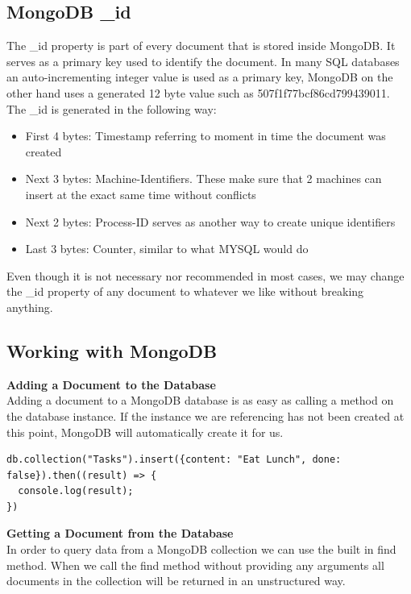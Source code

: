 \documentclass[11pt]{article}
\begin{document}
\subsection{MongoDB \_id}
The \_id property is part of every document that is stored inside MongoDB. It serves as a primary key used to identify the document. In many SQL databases an auto-incrementing integer value is used as a primary key, MongoDB on the other hand uses a generated 12 byte value such as 507f1f77bcf86cd799439011. The \_id is generated in the following way: 

\begin{itemize}
	\item First 4 bytes: Timestamp referring to moment in time the document was created
	\item Next 3 bytes: Machine-Identifiers. These make sure that 2 machines can insert at the exact same time without conflicts
	\item Next 2 bytes: Process-ID serves as another way to create unique identifiers
	\item Last 3 bytes: Counter, similar to what MYSQL would do
\end{itemize} 

Even though it is not necessary nor recommended in most cases, we may change the \_id property of any document to whatever we like without breaking anything. 






\subsection{Working with MongoDB}

\noindent
\textbf{Adding a  Document to the Database} \\  
Adding a document to a MongoDB database is as easy as calling a method on the database instance. If the instance we are referencing has not been created at this point, MongoDB will automatically create it for us.  

\begin{lstlisting}
db.collection("Tasks").insert({content: "Eat Lunch", done: false}).then((result) => {
  console.log(result);
})
\end{lstlisting}

\noindent
\textbf{Getting a  Document from the Database} \\  
In order to query data from a MongoDB collection we can use the built in find method. When we call the find method without providing any arguments all documents in the collection will be returned in an unstructured way. 
 
\end{document}
